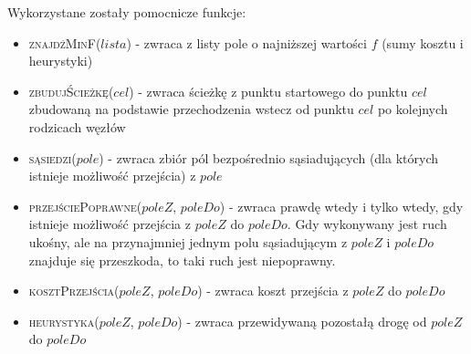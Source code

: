 Wykorzystane zostały pomocnicze funkcje:
\begin{itemize}
	\item \textsc{znajdźMinF}($lista$) - zwraca z listy pole o najniższej wartości $f$ (sumy kosztu i heurystyki)
	\item \textsc{zbudujŚcieżkę}($cel$) - zwraca ścieżkę z punktu startowego do punktu $cel$ zbudowaną na podstawie przechodzenia wstecz od punktu $cel$ po kolejnych rodzicach węzłów
	\item \textsc{sąsiedzi}($pole$) - zwraca zbiór pól bezpośrednio sąsiadujących (dla których istnieje możliwość przejścia) z $pole$
	\item \textsc{przejściePoprawne}($poleZ$, $poleDo$) - zwraca prawdę wtedy i tylko wtedy, gdy istnieje możliwość przejścia z $poleZ$ do $poleDo$. Gdy wykonywany jest ruch ukośny, ale na przynajmniej jednym polu sąsiadującym z $poleZ$ i $poleDo$ znajduje się przeszkoda, to taki ruch jest niepoprawny.
	\item \textsc{kosztPrzejścia}($poleZ$, $poleDo$) - zwraca koszt przejścia z $poleZ$ do $poleDo$
	\item \textsc{heurystyka}($poleZ$, $poleDo$) - zwraca przewidywaną pozostałą drogę od $poleZ$ do $poleDo$
\end{itemize}

